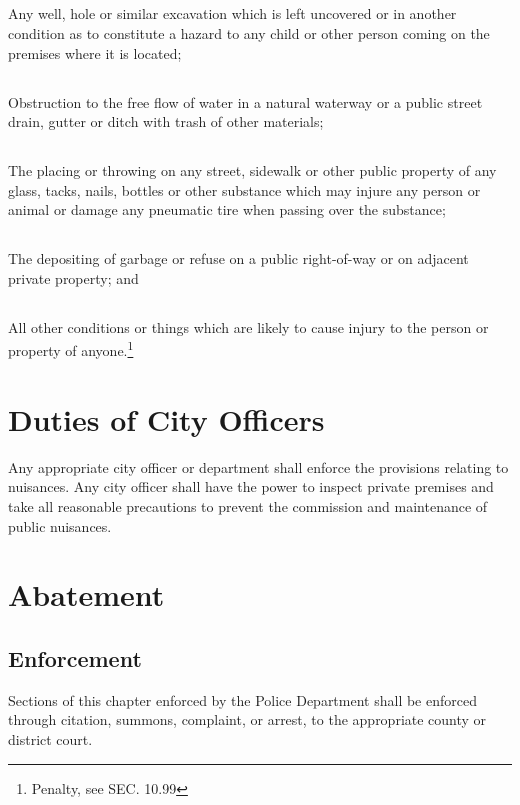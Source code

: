 \subsection{}
 Any well, hole or similar excavation which is left uncovered or in another condition as to constitute a hazard to any child or other person coming on the premises where it is located;
\subsection{}
 Obstruction to the free flow of water in a natural waterway or a public street drain, gutter or ditch with trash of other materials;
\subsection{}
 The placing or throwing on any street, sidewalk or other public property of any glass, tacks, nails, bottles or other substance which may injure any person or animal or damage any pneumatic tire when passing over the substance;
\subsection{}
 The depositing of garbage or refuse on a public right-of-way or on adjacent private property; and
\subsection{}
 All other conditions or things which are likely to cause injury to the person or property of anyone.\footnote{Penalty, see SEC. 10.99}
\section{Duties of City Officers}
Any appropriate city officer or department shall enforce the provisions relating to nuisances.  Any city officer shall have the power to inspect private premises and take all reasonable precautions to prevent the commission and maintenance of public nuisances.
\section{Abatement}
\subsection{Enforcement}
Sections of this chapter enforced by the Police Department shall be enforced through citation, summons, complaint, or arrest, to the appropriate county or district court.
